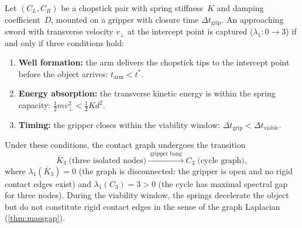 \begin{theorem}
\label{thm:c-capture}
Let $(C_L, C_R)$ be a chopstick pair with spring stiffness~$K$
and damping coefficient~$D$, mounted on a gripper with closure
time $\Delta t_{\mathrm{grip}}$.  An approaching sword with
transverse velocity $v_\perp$ at the intercept point is captured
($\lambda_1\colon 0 \to 3$) if and only if three conditions
hold:
\begin{enumerate}[label=(\roman*),nosep]
  \item \textbf{Well formation:} the arm delivers the chopstick
  tips to the intercept point before the object arrives:
  $t_{\mathrm{arm}} < t^*$.
  \item \textbf{Energy absorption:} the transverse kinetic energy
  is within the spring capacity:
  $\frac{1}{2}mv_\perp^2 < \frac{1}{2}Kd^2$.
  \item \textbf{Timing:} the gripper closes within the viability
  window:
  $\Delta t_{\mathrm{grip}} < \Delta t_{\mathrm{viable}}$.
\end{enumerate}
Under these conditions, the contact graph undergoes the transition
\[
  \bar{K}_3 \;\text{(three isolated nodes)}
  \xrightarrow{\;\text{gripper bang}\;}
  C_3 \;\text{(cycle graph)},
\]
where $\lambda_1(\bar{K}_3) = 0$ (the graph is disconnected:
the gripper is open and no rigid contact edges exist) and
$\lambda_1(C_3) = 3 > 0$ (the cycle has maximal spectral gap
for three nodes).  During the viability window, the springs
decelerate the object but do not constitute rigid contact
edges in the sense of the graph Laplacian
(\cref{thm:massgap}).
\end{theorem}

